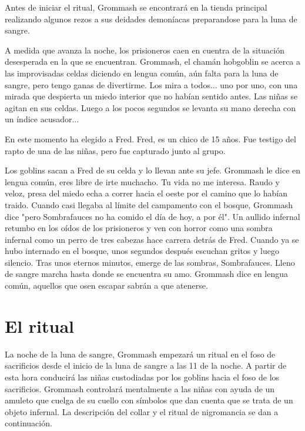 \documentclass[10pt,twoside,twocolumn,openany]{dndbook}
\begin{document}
Antes de iniciar el ritual, Grommash se encontrará en la tienda principal realizando algunos
rezos a sus deidades demoníacas preparandose para la luna de sangre.

\begin{DndReadAloud}
  A medida que avanza la noche, los prisioneros caen en cuentra de la situación desesperada en la 
  que se encuentran. Grommash, el chamán hobgoblin se acerca a las improvisadas celdas diciendo 
  en lengua común, aún falta para la luna de sangre, pero tengo ganas de divertirme. Los mira a 
  todos... uno por uno, con una mirada que despierta un miedo interior que no habían sentido 
  antes. Las niñas se agitan en sus celdas. Luego a los pocos segundos se levanta su mano derecha 
  con un índice acusador...
\end{DndReadAloud}

En este momento ha elegido a Fred. Fred, es un chico de 15 años. Fue testigo del rapto de una de las 
niñas, pero fue capturado junto al grupo.

\begin{DndReadAloud}
Los goblins sacan a Fred de su celda y lo llevan ante su jefe. Grommash le dice en lengua común, 
eres libre de irte muchacho. Tu vida no me interesa. Raudo y veloz, presa del miedo echa a correr 
hacia el oeste por el camino que lo habían traido. Cuando casi llegaba al límite del campamento 
con el bosque, Grommash dice "pero Sombrafauces no ha comido el día de hoy, a por él". Un aullido 
infernal retumbo en los oídos de los prisioneros y ven con horror como una sombra infernal como un 
perro de tres cabezas hace carrera detrás de Fred. Cuando ya se hubo internado en el bosque, unos 
segundos después escuchan gritos y luego silencio. Tras unos eternos minutos, emerge de las 
sombras, Sombrafauces. Lleno de sangre marcha hasta donde se encuentra su amo. Grommash dice en 
lengua común, aquellos que osen escapar sabrán a que atenerse.
\end{DndReadAloud}

\section{El ritual}
La noche de la luna de sangre, Grommash empezará un ritual en el foso de sacrificios desde el 
inicio de la luna de sangre a las 11 de la noche. A partir de esta hora conducirá las niñas 
custodiadas por los goblins hacia el foso de los sacrificios. Grommash controlará mentalmente a 
las niñas con ayuda de un amuleto que cuelga de su cuello con símbolos que dan cuenta que se 
trata de un objeto infernal. La descripción del collar y el ritual de nigromancia se dan a 
continuación.
\end{document}
